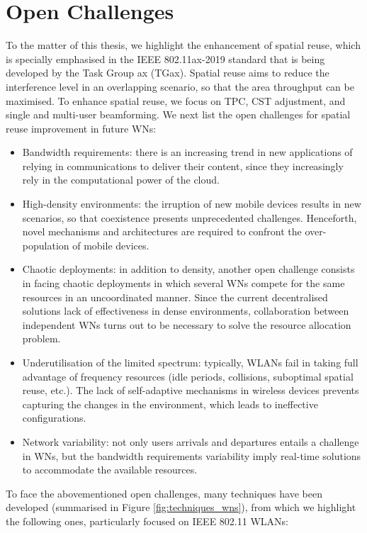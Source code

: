 \documentclass[12pt, a4paper,twoside]{tesi_upf}
\begin{document}
		\section{Open Challenges}
		\label{section:open_challenges}
			To the matter of this thesis, we highlight the enhancement of spatial reuse, which is specially emphasised in the IEEE 802.11ax-2019 standard that is being developed by the Task Group ax (TGax). Spatial reuse aims to reduce the interference level in an overlapping scenario, so that the area throughput can be maximised. To enhance spatial reuse, we focus on TPC, CST adjustment, and single and multi-user beamforming. We next list the open challenges for spatial reuse improvement in future WNs:
			\begin{itemize}
				\item Bandwidth requirements: there is an increasing trend in new applications of relying in communications to deliver their content, since they increasingly rely in the computational power of the cloud.
				\item High-density environments: the irruption of new mobile devices results in new scenarios, so that coexistence presents unprecedented challenges. Henceforth, novel mechanisms and architectures are required to confront the over-population of mobile devices. 
				\item Chaotic deployments: in addition to density, another open challenge consists in facing chaotic deployments in which several WNs compete for the same resources in an uncoordinated manner. Since the current decentralised solutions lack of effectiveness in dense environments, collaboration between independent WNs turns out to be necessary to solve the resource allocation problem.
				\item Underutilisation of the limited spectrum: typically, WLANs fail in taking full advantage of frequency resources (idle periods, collisions, suboptimal spatial reuse, etc.). The lack of self-adaptive mechanisms in wireless devices prevents capturing the changes in the environment, which leads to ineffective configurations.
				\item Network variability: not only users arrivals and departures entails a challenge in WNs, but the bandwidth requirements variability imply real-time solutions to accommodate the available resources.
			\end{itemize}
			To face the abovementioned open challenges, many techniques have been developed (summarised in Figure \ref{fig:techniques_wns}), from which we highlight the following ones, particularly focused on IEEE 802.11 WLANs:
\end{document}
